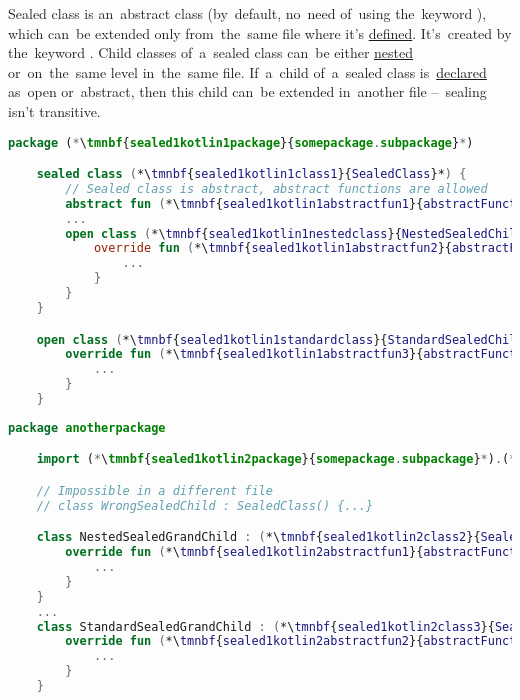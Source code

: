 \label{kotlinsealedclass}
Sealed class is an~abstract class (by~default, no~need of~using the~keyword ), which can~be extended only from~the~same file where it's \hyperref[declarationdefinition]{defined}.
It's~created by the~keyword .
Child classes of~a~sealed class can~be either \hyperref[kotlininnerclass]{nested} or~on~the~same level in~the~same file.
If~a~child of~a~sealed class is~\hyperref[declarationdefinition]{declared} as~open or~abstract, then this child can~be extended in~another file --~sealing isn't transitive.

\enlargethispage{20mm}
\thispagestyle{empty}
\example
\begin{lstlisting}[language=Kotlin, title={File with a~sealed class}]
    package (*\tmnbf{sealed1kotlin1package}{somepackage.subpackage}*)

    sealed class (*\tmnbf{sealed1kotlin1class1}{SealedClass}*) {
        // Sealed class is abstract, abstract functions are allowed
        abstract fun (*\tmnbf{sealed1kotlin1abstractfun1}{abstractFunction}*)()
        ...
        open class (*\tmnbf{sealed1kotlin1nestedclass}{NestedSealedChild}*) : (*\tmnbf{sealed1kotlin1class2}{SealedClass}*)() {
            override fun (*\tmnbf{sealed1kotlin1abstractfun2}{abstractFunction}*)() {
                ...
            }
        }
    }

    open class (*\tmnbf{sealed1kotlin1standardclass}{StandardSealedChild}*) : (*\tmnbf{sealed1kotlin1class3}{SealedClass}*)() {
        override fun (*\tmnbf{sealed1kotlin1abstractfun3}{abstractFunction}*)() {
            ...
        }
    }
\end{lstlisting}
\begin{lstlisting}[language=Kotlin, title={Another file with extensions of~children of~the~sealed class}]
    package anotherpackage

    import (*\tmnbf{sealed1kotlin2package}{somepackage.subpackage}*).(*\tmnbf{sealed1kotlin2class1}{SealedClass}*)

    // Impossible in a different file
    // class WrongSealedChild : SealedClass() {...}

    class NestedSealedGrandChild : (*\tmnbf{sealed1kotlin2class2}{SealedClass}*).(*\tmnbf{sealed1kotlin2nestedclass}{NestedSealedChild}*)() {
        override fun (*\tmnbf{sealed1kotlin2abstractfun1}{abstractFunction}*)() {
            ...
        }
    }
    ...
    class StandardSealedGrandChild : (*\tmnbf{sealed1kotlin2class3}{SealedClass}*).(*\tmnbf{sealed1kotlin2standardclass}{StandardSealedChild}*)() {
        override fun (*\tmnbf{sealed1kotlin2abstractfun2}{abstractFunction}*)() {
            ...
        }
    }
\end{lstlisting}
